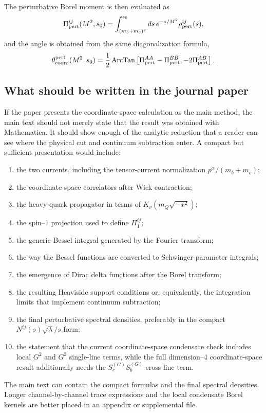 \documentclass[11pt]{article}
\begin{document}
The perturbative Borel moment is then evaluated as
\begin{equation}
  \Pi_{\rm pert}^{ij}(M^2,s_0)
  =
  \int_{(m_b+m_c)^2}^{s_0}ds\,
  e^{-s/M^2}\rho_{\rm pert}^{ij}(s),
\end{equation}
and the angle is obtained from the same diagonalization formula,
\begin{equation}
  \theta_{\rm coord}^{\rm pert}(M^2,s_0)
  =
  \frac12
  \operatorname{ArcTan}
  \left[
    \Pi_{\rm pert}^{AA}-\Pi_{\rm pert}^{BB},
    -2\Pi_{\rm pert}^{AB}
  \right].
\end{equation}

\subsection{What should be written in the journal paper}

If the paper presents the coordinate-space calculation as the main method,
the main text should not merely state that the result was obtained with
Mathematica.  It should show enough of the analytic reduction that a reader
can see where the physical cut and continuum subtraction enter.  A compact
but sufficient presentation would include:
\begin{enumerate}
  \item the two currents, including the tensor-current normalization
  \(p^\alpha/(m_b+m_c)\);
  \item the coordinate-space correlators after Wick contraction;
  \item the heavy-quark propagator in terms of \(K_\nu(m_Q\sqrt{-x^2})\);
  \item the spin--1 projection used to define \(\Pi_1^{ij}\);
  \item the generic Bessel integral generated by the Fourier transform;
  \item the way the Bessel functions are converted to Schwinger-parameter
  integrals;
  \item the emergence of Dirac delta functions after the Borel transform;
  \item the resulting Heaviside support conditions or, equivalently, the
  integration limits that implement continuum subtraction;
  \item the final perturbative spectral densities, preferably in the compact
  \(N^{ij}(s)\sqrt{\lambda}/s\) form;
  \item the statement that the current coordinate-space condensate check
  includes local \(G^2\) and \(G^3\) single-line terms, while the full
  dimension--4 coordinate-space result additionally needs the
  \(S_c^{(G)}S_b^{(G)}\) cross-line term.
\end{enumerate}
The main text can contain the compact formulas and the final spectral
densities.  Longer channel-by-channel trace expressions and the local
condensate Borel kernels are better placed in an appendix or supplemental
file.
\end{document}
